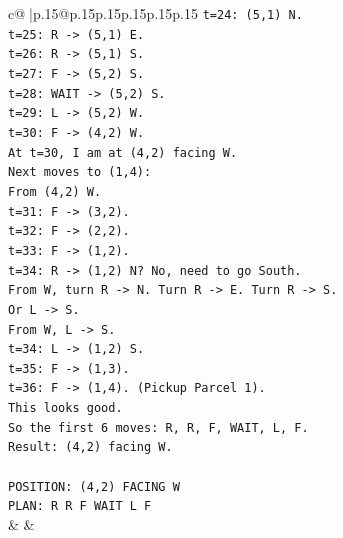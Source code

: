 \documentclass{article}
\begin{document}
{\begin{supertabular}{c@{$\;$}|p{.15\linewidth}@{}p{.15\linewidth}p{.15\linewidth}p{.15\linewidth}p{.15\linewidth}p{.15\linewidth}}
{{{\texttt{t=24: (5,1) N.} \\
\texttt{t=25: R {-}> (5,1) E.} \\
\texttt{t=26: R {-}> (5,1) S.} \\
\texttt{t=27: F {-}> (5,2) S.} \\
\texttt{t=28: WAIT {-}> (5,2) S.} \\
\texttt{t=29: L {-}> (5,2) W.} \\
\texttt{t=30: F {-}> (4,2) W.} \\
\texttt{At t=30, I am at (4,2) facing W.} \\
\texttt{Next moves to (1,4):} \\
\texttt{From (4,2) W.} \\
\texttt{t=31: F {-}> (3,2).} \\
\texttt{t=32: F {-}> (2,2).} \\
\texttt{t=33: F {-}> (1,2).} \\
\texttt{t=34: R {-}> (1,2) N? No, need to go South.} \\
\texttt{From W, turn R {-}> N. Turn R {-}> E. Turn R {-}> S.} \\
\texttt{Or L {-}> S.} \\
\texttt{From W, L {-}> S.} \\
\texttt{t=34: L {-}> (1,2) S.} \\
\texttt{t=35: F {-}> (1,3).} \\
\texttt{t=36: F {-}> (1,4). (Pickup Parcel 1).} \\
\texttt{This looks good.} \\
\texttt{So the first 6 moves: R, R, F, WAIT, L, F.} \\
\texttt{Result: (4,2) facing W.} \\
\\ 
\texttt{POSITION: (4,2) FACING W} \\
\texttt{PLAN: R R F WAIT L F} \\
            }
        }
    }
    & & \\ \\


\end{supertabular}}
\end{document}
